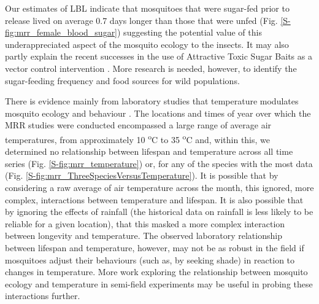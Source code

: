 \documentclass[]{article}
\begin{document}
Our estimates of LBL indicate that mosquitoes that were sugar-fed prior
to release lived on average 0.7 days longer than those that were unfed (Fig. \ref{S-fig:mrr_female_blood_sugar})
suggesting the potential value of this underappreciated aspect of the
mosquito ecology to the insects. It may also partly explain the recent
successes in the use of Attractive Toxic Sugar Baits as a vector
control intervention \citep{muller2008decline,muller2010effective,muller2010field,muller2010successful,beier2012attractive}. More research is
needed, however, to identify the sugar-feeding frequency and food
sources for wild populations.

There is evidence mainly from laboratory studies that temperature
modulates mosquito ecology and behaviour \citep{yang2009assessing,brady2013modelling,murdock2012complex,beck2013effect}. The
locations and times of year over which the MRR studies were conducted
encompassed a large range of average air temperatures, from
approximately 10 \textsuperscript{o}C to 35 \textsuperscript{o}C and,
within this, we determined no relationship between lifespan and
temperature across all time series (Fig. \ref{S-fig:mrr_temperature}) or, for any of the species
with the most data (Fig. \ref{S-fig:mrr_ThreeSpeciesVersusTemperature}). It is possible that by considering a raw
average of air temperature across the month, this ignored, more complex, interactions between temperature and lifespan. It is also possible that by ignoring the effects of
rainfall (the historical data on rainfall is less likely to be reliable
for a given location), that this masked a more complex interaction
between longevity and temperature. The observed laboratory relationship
between lifespan and temperature, however, may not be as robust in the
field if mosquitoes adjust their behaviours (such as, by seeking shade)
in reaction to changes in temperature. More work exploring the
relationship between mosquito ecology and temperature in semi-field
experiments may be useful in probing these interactions further.
\end{document}
